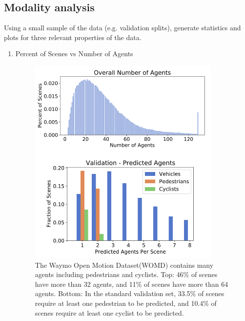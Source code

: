 \documentclass{article} %
\begin{document}
	\subsection{Modality analysis}
	Using a small sample of the data (e.g. validation splits), generate statistics and plots for three relevant properties of the data.  
	\begin{enumerate}
		\item  Percent of Scenes vs Number of Agents
		
		\begin{figure}[!htbp]
			\centering
			\includegraphics[width=0.9\textwidth]{Figures/Agents_Stat.png}
			\caption{The Waymo Open Motion Dataset(WOMD)\cite{Ettinger2021LargeSI} contains many agents including pedestrians and cyclists. Top: 46\% of scenes have more than 32 agents, and 11\% of scenes have more than 64
				agents. Bottom: In the standard validation set, 33.5\% of
				scenes require at least one pedestrian to be predicted, and
				10.4\% of scenes require at least one cyclist to be predicted.}
			\label{fig:Dataset1}
		\end{figure}
		

\end{enumerate}
\end{document}
